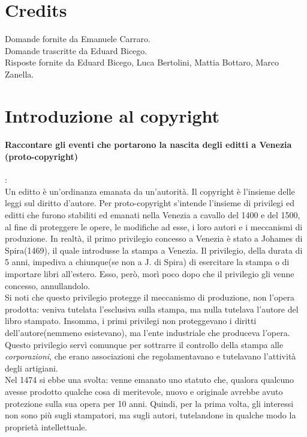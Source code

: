 \documentclass[a4paper]{article}
\begin{document}
	\section{Credits}
	Domande fornite da Emanuele Carraro. \\
	Domande trascritte da Eduard Bicego. \\
	Risposte fornite da Eduard Bicego, Luca Bertolini, Mattia Bottaro, Marco Zanella.
	
	\section{Introduzione al copyright}
	
		\paragraph{Raccontare gli eventi che portarono la nascita degli editti a Venezia (proto-copyright)}:\\
		Un editto è un'ordinanza emanata da un'autorità.
		Il copyright è l'insieme delle leggi sul diritto d'autore.
		Per proto-copyright s'intende l'insieme di privilegi ed editti che furono stabiliti ed emanati nella Venezia a cavallo del 1400 e del 1500, al fine di proteggere le opere, le modifiche ad esse, i loro autori e i meccanismi di produzione.
		In realtà, il primo privilegio concesso a Venezia è stato a Johames di Spira(1469), il quale introdusse la stampa a Venezia. Il privilegio, della durata di 5 anni, impediva a chiunque(se non a J. di Spira) di esercitare la stampa o di importare libri all'estero. Esso, però, morì poco dopo che il privilegio gli venne concesso, annullandolo. \\
		Si noti che questo privilegio protegge il meccanismo di produzione, non l'opera prodotta: veniva tutelata l'esclusiva sulla stampa, ma nulla tutelava l'autore del libro stampato.
		Insomma, i primi privilegi non proteggevano i diritti dell'autore(nemmeno esistevano), ma l'ente industriale che produceva l'opera.
		Questo privilegio servì comunque per sottrarre il controllo della stampa alle \textit{corporazioni}, che erano associazioni che regolamentavano e tutelavano l'attività degli artigiani.\\
		Nel 1474 si ebbe una svolta: venne emanato uno statuto che, qualora qualcuno avesse prodotto qualche cosa di meritevole, nuovo e originale avrebbe avuto protezione sulla sua opera per 10 anni. Quindi, per la prima volta, gli interessi non sono più sugli stampatori, ma sugli autori, tutelandone in qualche modo la proprietà intellettuale.
\end{document}
